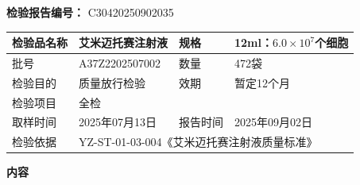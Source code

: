\documentclass[UTF8,10pt,a4paper,fontset=fandol]{ctexart}
\newcommand{\fieldvalue}[1]{#1}
\begin{document}
\textbf{检验报告编号：}
\fieldvalue{C30420250902035}

\begin{tabularx}{\textwidth}{|p{2.2cm}|X|p{1.8cm}|X|}
\hline
检验品名称 &
\fieldvalue{艾米迈托赛注射液}
&
规格 &
\fieldvalue{12ml：$6.0\times10^{7}$个细胞}
\\ \hline
批号 &
\fieldvalue{A37Z2202507002}
&
数量 &
\fieldvalue{472袋}
\\ \hline
检验目的 &
\fieldvalue{质量放行检验}
&
效期 &
\fieldvalue{暂定12个月}
\\ \hline
检验项目 &
\fieldvalue{全检}
&
\multicolumn{2}{l|}{}
\\ \hline
取样时间 &
\fieldvalue{2025年07月13日}
&
报告时间 &
\fieldvalue{2025年09月02日}
\\ \hline
检验依据 &
\multicolumn{3}{l|}{
\fieldvalue{YZ-ST-01-03-004《艾米迈托赛注射液质量标准》}
}
\\ \hline
\end{tabularx}

\begin{center}
\textbf{内\quad 容}
\end{center}
\end{document}
